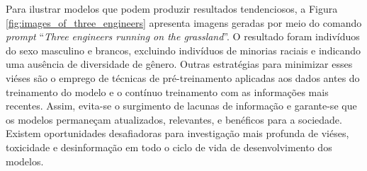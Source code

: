 
Para ilustrar modelos que podem produzir resultados tendenciosos, a Figura \ref{fig:images_of_three_engineers} apresenta 
imagens geradas por meio do comando \textit{prompt} ``\textit{Three engineers running on the grassland}''. 
O resultado foram indivíduos do sexo masculino e brancos, excluindo indivíduos de minorias raciais e
indicando uma ausência de diversidade de gênero.
Outras estratégias para minimizar esses viéses são o emprego de técnicas de pré-treinamento aplicadas aos dados antes do treinamento do 
modelo e o contínuo treinamento com as informações mais recentes. Assim, evita-se o 
surgimento de lacunas de informação e garante-se que os modelos permaneçam atualizados, relevantes, 
e benéficos para a sociedade. Existem oportunidades desafiadoras para investigação mais profunda de viéses,
toxicidade e desinformação em todo o ciclo de vida de desenvolvimento dos modelos.


